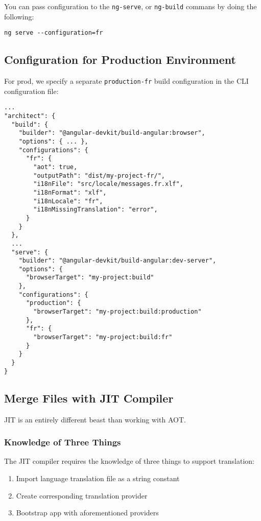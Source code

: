 You can pass configuration to the \lstinline{ng-serve}, or \lstinline{ng-build}
commans by doing the following: 
\begin{verbatim}
ng serve --configuration=fr
\end{verbatim}

\subsection{Configuration for Production Environment}
For prod, we specify a separate \lstinline{production-fr} build configuration 
in the CLI configuration file: 
\begin{lstlisting}[caption=angular.json]
...
"architect": {
  "build": {
    "builder": "@angular-devkit/build-angular:browser",
    "options": { ... },
    "configurations": {
      "fr": {
        "aot": true,
        "outputPath": "dist/my-project-fr/",
        "i18nFile": "src/locale/messages.fr.xlf",
        "i18nFormat": "xlf",
        "i18nLocale": "fr",
        "i18nMissingTranslation": "error",
      }
    }
  },
  ...
  "serve": {
    "builder": "@angular-devkit/build-angular:dev-server",
    "options": {
      "browserTarget": "my-project:build"
    },
    "configurations": {
      "production": {
        "browserTarget": "my-project:build:production"
      },
      "fr": {
        "browserTarget": "my-project:build:fr"
      }
    }
  }
}  
\end{lstlisting}

\subsection{Merge Files with JIT Compiler}
JIT is an entirely different beast than working with AOT. 


\subsubsection{ Knowledge of Three Things }
The JIT compiler requires the knowledge of three things to support translation: 
\begin{enumerate}
  \item Import language translation file as a string constant
  \item Create corresponding translation provider
  \item Bootstrap app with aforementioned providers
\end{enumerate}

